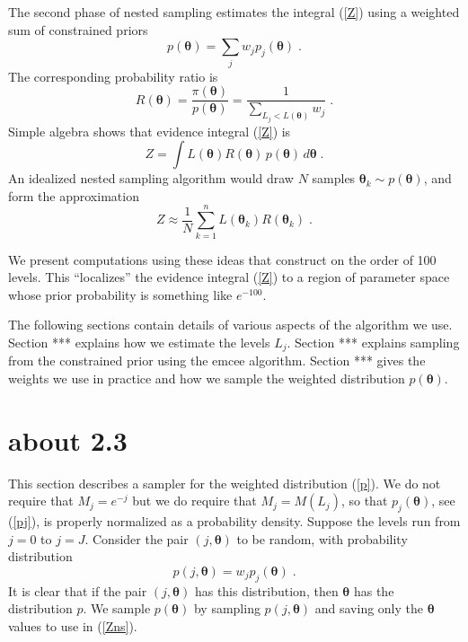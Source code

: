\documentclass[letterpaper, preprint]{aastex}
\newcommand{\bth} {\boldsymbol \theta}
\begin{document}
The second phase of nested sampling estimates the integral (\ref{Z}) using a weighted sum
of constrained priors
\begin{equation}
p(\bth) = \sum_j w_j p_j(\bth) \; .
\label{p} \end{equation}
The corresponding probability ratio is
\begin{equation}
R(\bth) = \frac{\pi(\bth)}{p(\bth)} = \frac{1}{\displaystyle \sum_{L_j < L(\bth)}w_j } \; .
\label{R} \end{equation}
Simple algebra shows that evidence integral (\ref{Z}) is
\begin{equation}
Z = \int L(\bth)R(\bth) \,p(\bth) \,d \bth \; .
\label{ZR}  \end{equation}
An idealized nested sampling algorithm would draw $N$ samples $\bth_k \sim p(\bth)$, and form the 
approximation
\begin{equation}
Z \approx \frac{1}{N} \sum_{k=1}^n L(\bth_k) R(\bth_k) \; .
\label{Zns} \end{equation}

We present computations using these ideas that construct on the order of 100 levels.
This ``localizes'' the evidence integral (\ref{Z}) to a region of parameter space whose prior
probability is something like $e^{-100}$.

The following sections contain details of various aspects of the algorithm we use.
Section *** explains how we estimate the levels $L_j$.
Section *** explains sampling from the constrained prior using the emcee algorithm.
Section *** gives the weights we use in practice and how we sample the weighted distribution 
$p(\bth)$.







\section{about 2.3}

This section describes a sampler for the weighted distribution (\ref{p}).
We do not require that $M_j = e^{-j}$ but we do require that $M_j = M(L_j)$, so that $p_j(\bth)$,
see (\ref{pj}), is properly normalized as a probability density.
Suppose the levels run from $j=0$ to $j=J$.
Consider the pair $(j,\bth)$ to be random, with probability distribution 
\begin{equation}
p(j,\bth) = w_jp_j(\bth) \; .
\label{pjth}  \end{equation}
It is clear that if the pair $(j,\bth)$ has this distribution, then $\bth$ has the distribution $p$.
We sample $p(\bth)$ by sampling $p(j,\bth)$ and saving only the $\bth$ values to use in (\ref{Zns}).
\end{document}
